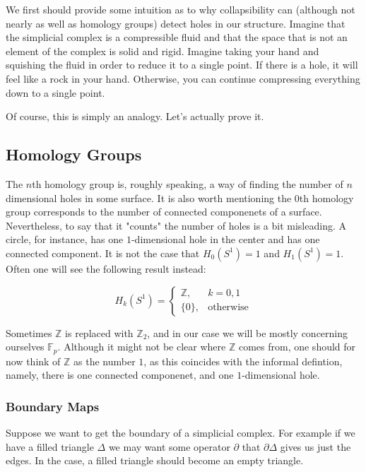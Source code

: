 \documentclass[letterpaper,12pt]{article}
\begin{document}
We first should provide some intuition as to why collapsibility can (although not nearly as well as homology groups) detect holes in our structure. Imagine that the simplicial complex is a compressible fluid and that the space that is not an element of the complex is solid and rigid. Imagine taking your hand and squishing the fluid in order to reduce it to a single point. If there is a hole, it will feel like a rock in your hand. Otherwise, you can continue compressing everything down to a single point.

Of course, this is simply an analogy. Let's actually prove it.

\subsection{Homology Groups}

The $n$th homology group is, roughly speaking, a way of finding the number of $n$ dimensional holes in some surface. It is also worth mentioning the $0$th homology group corresponds to the number of connected componenets of a surface. Nevertheless, to say that it "counts" the number of holes is a bit misleading. A circle, for instance, has one $1$-dimensional hole in the center and has one connected component. It is not the case that $H_0(S^1) = 1$ and $H_1(S^1) = 1$. Often one will see the following result instead:

$$H_k(S^1) =
\begin{cases}
    \mathbb{Z}, & k = 0, 1 \\
    \{ 0 \}, & \text{otherwise}
\end{cases}
$$

Sometimes $\mathbb{Z}$ is replaced with $\mathbb{Z}_2$, and in our case we will be mostly concerning ourselves $\mathbb{F}_p$. Although it might not be clear where $\mathbb{Z}$ comes from, one should for now think of $\mathbb{Z}$ as the number $1$, as this coincides with the informal defintion, namely, there is one connected componenet, and one $1$-dimensional hole.

\subsubsection{Boundary Maps}

Suppose we want to get the boundary of a simplicial complex. For example if we have a filled triangle $\Delta$ we may want some operator $\partial$ that $\partial \Delta$ gives us just the edges. In the case, a filled triangle should become an empty triangle.
\end{document}
